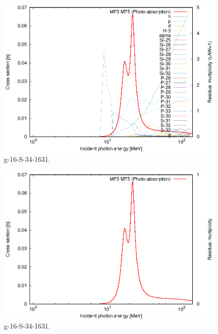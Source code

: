\begin{figure}
 \includegraphics[width=\linewidth]{eps/g_16-S-34_1631.eps}
  \caption{g-16-S-34-1631.}
\end{figure}
\begin{figure}
 \includegraphics[width=\linewidth]{eps-law0/g_16-S-34_1631.eps}
 \caption{g-16-S-34-1631.}
\end{figure}
\newpage \clearpage


